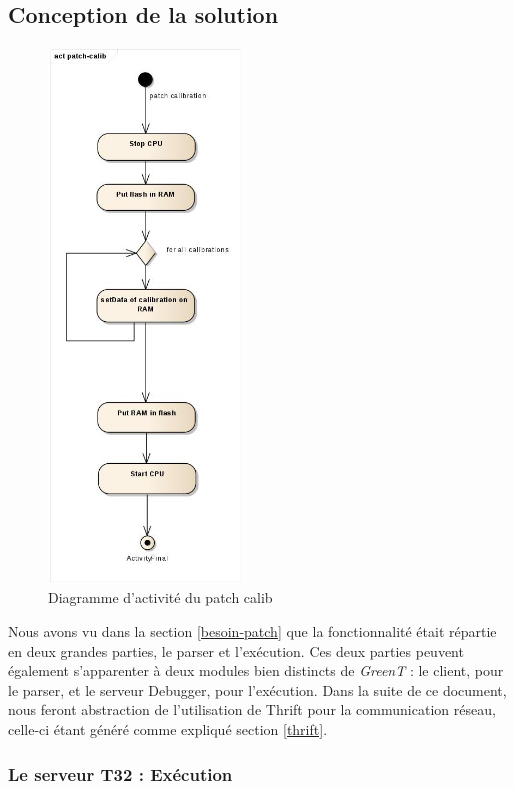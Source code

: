 \subsection{Conception de la solution}
		\begin{figure}
			\vspace{-15px}
			\includegraphics[height=14.2cm]{contents/images/script_activite.jpg}
			\caption{Diagramme d'activité du patch calib}
			\label{fig:scriptBatch} 
			\vspace{-3.5cm}
		\end{figure}
	Nous avons vu dans la section \ref{besoin-patch} que la fonctionnalité était répartie en deux grandes parties, le parser et l'exécution. Ces deux parties peuvent également s'apparenter à deux modules bien distincts de \textit{GreenT} : le client, pour le parser, et le serveur Debugger, pour l'exécution. Dans la suite de ce document, nous feront abstraction de l'utilisation de Thrift pour la communication réseau, celle-ci étant généré comme expliqué section \ref{thrift}.
	
	\subsubsection{Le serveur T32 : Exécution}

